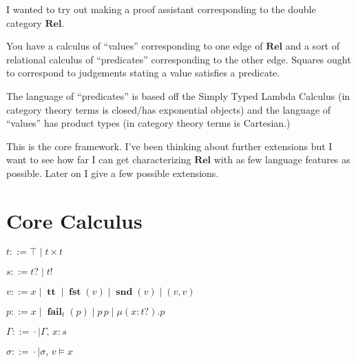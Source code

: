 \documentclass[twocolumn]{scrartcl}
\newcommand{\Rel}{\textbf{Rel}}
\newcommand{\bnfdef}{\mathbin{::=}}
\DeclareMathOperator{\coin}{\textbf{tt}}
\DeclareMathOperator{\fst}{\textbf{fst}}
\DeclareMathOperator{\snd}{\textbf{snd}}
\DeclareMathOperator{\fail}{\textbf{fail}}
\begin{document}
I wanted to try out making a proof assistant corresponding to the
double category \(\Rel\).

You have a calculus of ``values'' corresponding to one edge of
\(\Rel\) and a sort of relational calculus of ``predicates''
corresponding to the other edge. Squares ought to correspond to
judgements stating a value satisfies a predicate.

The language of ``predicates'' is based off the Simply Typed Lambda
Calculus (in category theory terms is closed/has exponential objects)
and the language of ``values'' has product types (in category theory
terms is Cartesian.)

This is the core framework.  I've been thinking about further
extensions but I want to see how far I can get characterizing
\(\Rel\) with as few language features as possible.  Later on I
give a few possible extensions.



\begin{center}
\end{center}

\section*{Core Calculus}

\begin{description}[nosep]
\item[Types] \hfill \( t \bnfdef \top \mid t \times t \)
\item[Sorts] \hfill \( s \bnfdef t ? \mid t ! \)
\item[Values] \hfill \( v \bnfdef x \mid \coin \mid \fst(v) \mid \snd(v) \mid ( v , v ) \)
\item[Predicates] \hfill \( p \bnfdef x \mid \fail_t(p) \mid p \, p \mid \mu (x \colon t ?) . p \)
\item[Environment] \hfill \( \Gamma \bnfdef \cdot \mid \Gamma , \, x \colon s  \)
\item[Substitutions] \hfill \( \sigma \bnfdef \cdot \mid \sigma , \, v \models x  \)
\end{description}
\end{document}
